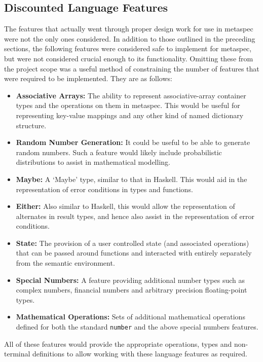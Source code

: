 \subsection{Discounted Language Features} %
\label{sub:discounted_language_features}
The features that actually went through proper design work for use in \gls{metaspec} were not the only ones considered. 
In addition to those outlined in the preceding sections, the following features were considered safe to implement for \gls{metaspec}, but were not considered crucial enough to its functionality.
Omitting these from the project scope was a useful method of constraining the number of features that were required to be implemented.
They are as follows:
\begin{itemize}
    \item \textbf{Associative Arrays:} The ability to represent associative-array container types and the operations on them in metaspec. 
    This would be useful for representing key-value mappings and any other kind of named dictionary structure.
    \item \textbf{Random Number Generation:} It could be useful to be able to generate random numbers.
    Such a feature would likely include probabilistic distributions to assist in mathematical modelling.
    \item \textbf{Maybe:} A `Maybe' type, similar to that in Haskell.
    This would aid in the representation of error conditions in types and functions.
    \item \textbf{Either:} Also similar to Haskell, this would allow the representation of alternates in result types, and hence also assist in the representation of error conditions.
    \item \textbf{State:} The provision of a user controlled state (and associated operations) that can be passed around functions and interacted with entirely separately from the semantic environment.
    \item \textbf{Special Numbers:} A feature providing additional number types such as complex numbers, financial numbers and arbitrary precision floating-point types.
    \item \textbf{Mathematical Operations:} Sets of additional mathematical operations defined for both the standard \texttt{number} and the above special numbers features. 
\end{itemize}

All of these features would provide the appropriate operations, types and non-terminal definitions to allow working with these language features as required. 



